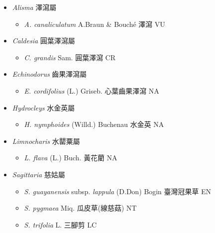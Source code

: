 
  \begin{itemize}
 \item[] \textit{Alisma} 澤瀉屬
                                
  \begin{itemize}
        \item[] \textit{A. canaliculatum} A.Braun \& Bouché  澤瀉   VU
  \end{itemize}
 \item[] \textit{Caldesia} 圓葉澤瀉屬
                                
  \begin{itemize}
        \item[] \textit{C. grandis} Sam.  圓葉澤瀉   CR
  \end{itemize}
 \item[] \textit{Echinodorus} 齒果澤瀉屬
                                
  \begin{itemize}
        \item[] \textit{E. cordifolius} (L.) Griseb.  心葉齒果澤瀉   NA
  \end{itemize}
 \item[] \textit{Hydrocleys} 水金英屬
                                
  \begin{itemize}
        \item[] \textit{H. nymphoides} (Willd.) Buchenau  水金英   NA
  \end{itemize}
 \item[] \textit{Limnocharis} 水罌粟屬
                                
  \begin{itemize}
        \item[] \textit{L. flava} (L.) Buch.  黃花藺   NA
  \end{itemize}
 \item[] \textit{Sagittaria} 慈姑屬
                                
  \begin{itemize}
        \item[] \textit{S. guayanensis} subsp. \textit{lappula} (D.Don) Bogin  臺灣冠果草   EN
        \item[] \textit{S. pygmaea} Miq.  瓜皮草(線慈菇)   NT
        \item[] \textit{S. trifolia} L.  三腳剪   LC
  \end{itemize}
  \end{itemize}
